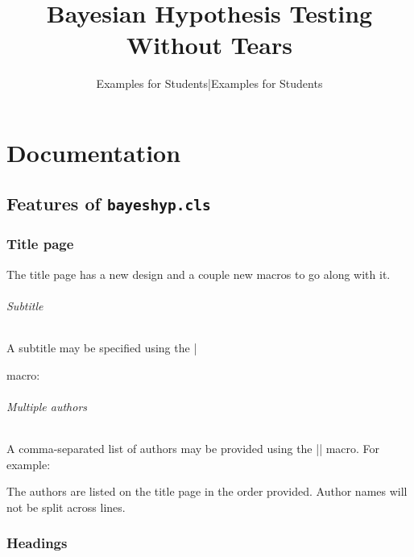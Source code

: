 \documentclass{bayeshyp}
\title{Bayesian Hypothesis Testing Without Tears}
\subtitle{Examples for Students}
\begin{document}
\maketitle

\tableofcontents

\mainmatter

\setcounter{secnumdepth}{1}

\part{Documentation}

\chapter{Features of \texttt{bayeshyp.cls}}

\section{Title page}

The title page has a new design and a couple new macros to go along with it.

\paragraph{Subtitle}

A subtitle may be specified using the \syn|\subtitle| macro:

\begin{syntax}
  \subtitle{Examples for Students}
\end{syntax}

\paragraph{Multiple authors}

A comma-separated list of authors may be provided using the \syn|\authors| macro. For example:
\begin{syntax}
\end{syntax}

The authors are listed on the title page in the order provided.
Author names will not be split across lines.

\section{Headings}
\end{document}
